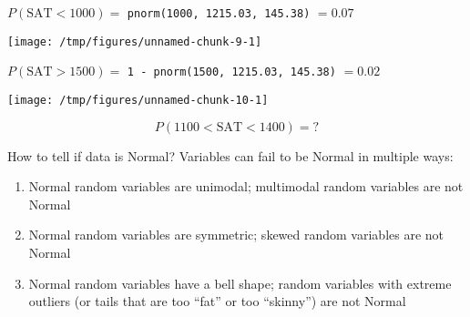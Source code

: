 \documentclass{beamer}\usepackage[]{graphicx}\usepackage[]{color}
\makeatletter
\def\maxwidth{ %
  \ifdim\Gin@nat@width>\linewidth
    \linewidth
  \else
    \Gin@nat@width
  \fi
}
\newcommand{\hlopt}[1]{\textcolor[rgb]{0,0,0}{#1}}%
\newcommand{\hlstd}[1]{\textcolor[rgb]{0.345,0.345,0.345}{#1}}%
\newcommand{\hlkwd}[1]{\textcolor[rgb]{0.737,0.353,0.396}{\textbf{#1}}}%
\newenvironment{kframe}{%
 \def\at@end@of@kframe{}%
 \ifinner\ifhmode%
  \def\at@end@of@kframe{\end{minipage}}%
  \begin{minipage}{\columnwidth}%
 \fi\fi%
 \def\FrameCommand##1{\hskip\@totalleftmargin \hskip-\fboxsep
 \colorbox{shadecolor}{##1}\hskip-\fboxsep
     \hskip-\linewidth \hskip-\@totalleftmargin \hskip\columnwidth}%
 \MakeFramed {\advance\hsize-\width
   \@totalleftmargin\z@ \linewidth\hsize
   \@setminipage}}%
 {\par\unskip\endMakeFramed%
 \at@end@of@kframe}
\newenvironment{knitrout}{}{} %
\makeatother
\begin{document}
\begin{darkframes}
\begin{frame}
\begin{knitrout}
\end{knitrout}
  \begin{center}
    $P(\text{SAT}<1000) = $ \texttt{pnorm(1000, 1215.03, 145.38)} $ = 0.07$ 
  \end{center}
\end{frame}

\begin{frame}
\begin{knitrout}
\color{fgcolor}
\texttt{[image: /tmp/figures/unnamed-chunk-9-1]} 

\end{knitrout}
  \begin{center}
    $P(\text{SAT}>1500) = $ \texttt{1 - pnorm(1500, 1215.03, 145.38)} $ = 0.02$ 
  \end{center}
\end{frame}

\begin{frame}[fragile]
\begin{knitrout}
\color{fgcolor}
\texttt{[image: /tmp/figures/unnamed-chunk-10-1]} 

\end{knitrout}

  \[
    P(1100<\text{SAT}<1400) = \text{?}
  \]
\end{frame}

\begin{frame}{How to tell if data is Normal?}
  Variables can fail to be Normal in multiple ways:
  \begin{enumerate}
    \item Normal random variables are \alert{unimodal}; multimodal random variables are not Normal
    \item Normal random variables are \alert{symmetric}; skewed random variables are not Normal
    \item Normal random variables have a \alert{bell shape}; random variables with extreme outliers (or tails that are too ``fat'' or too ``skinny'') are not Normal
  \end{enumerate}
\end{frame}

\end{darkframes}
\end{document}
